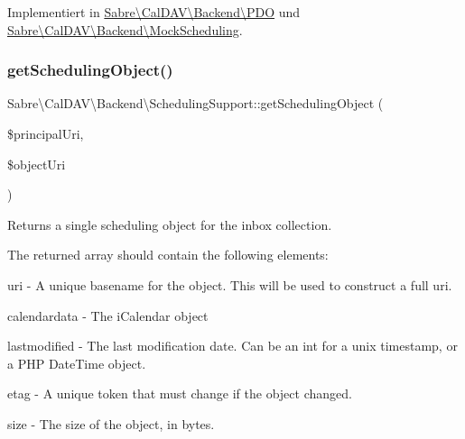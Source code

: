 Implementiert in \mbox{\hyperlink{class_sabre_1_1_cal_d_a_v_1_1_backend_1_1_p_d_o_af842881c8a8ee265bb8cca7be1f0df14}{Sabre\textbackslash{}\+Cal\+D\+A\+V\textbackslash{}\+Backend\textbackslash{}\+P\+DO}} und \mbox{\hyperlink{class_sabre_1_1_cal_d_a_v_1_1_backend_1_1_mock_scheduling_a8cb76d18dfa6c8a346343041a21357b4}{Sabre\textbackslash{}\+Cal\+D\+A\+V\textbackslash{}\+Backend\textbackslash{}\+Mock\+Scheduling}}.

\mbox{\label{interface_sabre_1_1_cal_d_a_v_1_1_backend_1_1_scheduling_support_a01af6a746c7ed902a83c7eda56226519}} 
\subsubsection{\texorpdfstring{get\+Scheduling\+Object()}{getSchedulingObject()}}
{\footnotesize\ttfamily Sabre\textbackslash{}\+Cal\+D\+A\+V\textbackslash{}\+Backend\textbackslash{}\+Scheduling\+Support\+::get\+Scheduling\+Object (\begin{DoxyParamCaption}\item[{}]{\$principal\+Uri,  }\item[{}]{\$object\+Uri }\end{DoxyParamCaption})}

Returns a single scheduling object for the inbox collection.

The returned array should contain the following elements\+:
\begin{DoxyItemize}
\item uri -\/ A unique basename for the object. This will be used to construct a full uri.
\item calendardata -\/ The i\+Calendar object
\item lastmodified -\/ The last modification date. Can be an int for a unix timestamp, or a P\+HP Date\+Time object.
\item etag -\/ A unique token that must change if the object changed.
\item size -\/ The size of the object, in bytes.
\end{DoxyItemize}


